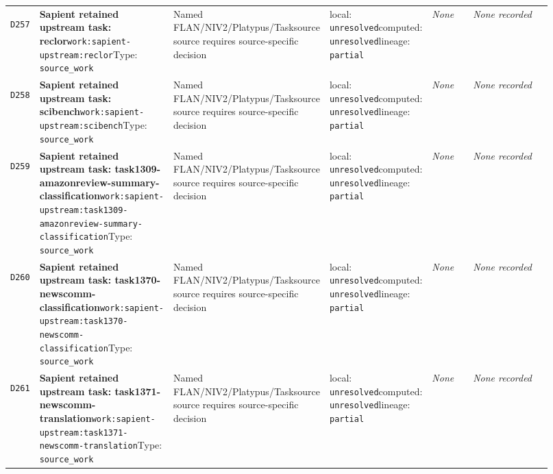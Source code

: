 \documentclass[9pt,a4paper]{article}
\newcommand{\depid}[1]{\hypertarget{dep:#1}{\texttt{#1}}}
\begin{document}
\begin{landscape}
\begin{longtable}{@{}L{0.035\linewidth}L{0.185\linewidth}L{0.27\linewidth}L{0.09\linewidth}L{0.10\linewidth}L{0.24\linewidth}@{}}
\depid{D257} & \textbf{Sapient retained upstream task: reclor}\newline \nolinkurl{work:sapient-upstream:reclor}\newline Type: \texttt{source\_work} & Named FLAN/NIV2/Platypus/Tasksource source requires source-specific decision & local: \texttt{unresolved}\newline computed: \texttt{unresolved}\newline lineage: \texttt{partial} & \textit{None} & \textit{None recorded} \\
\depid{D258} & \textbf{Sapient retained upstream task: scibench}\newline \nolinkurl{work:sapient-upstream:scibench}\newline Type: \texttt{source\_work} & Named FLAN/NIV2/Platypus/Tasksource source requires source-specific decision & local: \texttt{unresolved}\newline computed: \texttt{unresolved}\newline lineage: \texttt{partial} & \textit{None} & \textit{None recorded} \\
\depid{D259} & \textbf{Sapient retained upstream task: task1309-amazonreview-summary-classification}\newline \nolinkurl{work:sapient-upstream:task1309-amazonreview-summary-classification}\newline Type: \texttt{source\_work} & Named FLAN/NIV2/Platypus/Tasksource source requires source-specific decision & local: \texttt{unresolved}\newline computed: \texttt{unresolved}\newline lineage: \texttt{partial} & \textit{None} & \textit{None recorded} \\
\depid{D260} & \textbf{Sapient retained upstream task: task1370-newscomm-classification}\newline \nolinkurl{work:sapient-upstream:task1370-newscomm-classification}\newline Type: \texttt{source\_work} & Named FLAN/NIV2/Platypus/Tasksource source requires source-specific decision & local: \texttt{unresolved}\newline computed: \texttt{unresolved}\newline lineage: \texttt{partial} & \textit{None} & \textit{None recorded} \\
\depid{D261} & \textbf{Sapient retained upstream task: task1371-newscomm-translation}\newline \nolinkurl{work:sapient-upstream:task1371-newscomm-translation}\newline Type: \texttt{source\_work} & Named FLAN/NIV2/Platypus/Tasksource source requires source-specific decision & local: \texttt{unresolved}\newline computed: \texttt{unresolved}\newline lineage: \texttt{partial} & \textit{None} & \textit{None recorded} \\

\end{longtable}
\end{landscape}
\end{document}
